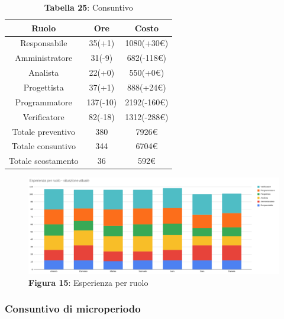 \begin{table}[H]
	\centering
	\renewcommand{\arraystretch}{1.5}
	\begin{tabular}{|c|c|c|}
		\hline
		\rowcolor{lighter-grayer}
		Ruolo & Ore & Costo \\ \hline
		Responsabile & 35(+1) & 1080(+30\euro) \\ \hline
		Amministratore & 31(-9) & 682(-118\euro) \\ \hline
		Analista & 22(+0) & 550(+0\euro) \\ \hline
		Progettista & 37(+1) & 888(+24\euro) \\ \hline
		Programmatore & 137(-10) & 2192(-160\euro) \\ \hline
		Verificatore & 82(-18) & 1312(-288\euro) \\ \hline
		Totale preventivo & 380 & 7926\euro \\ \hline
		Totale consuntivo & 344 & 6704\euro \\ \hline
		Totale scostamento & 36 & 592\euro \\ \hline
	\end{tabular}
	\caption*{\textbf{Tabella 25}: Consuntivo\\}
\end{table}

\begin{figure}[H]
	\centering
	\includegraphics[width=15cm]{res/images/GraficoRuoliDettaglioCodifica.png}
	\caption*{\textbf{Figura 15}: Esperienza per ruolo}
	\label{fig:Esperienza per ruolo}
\end{figure}

\subsubsection{Consuntivo di microperiodo}
